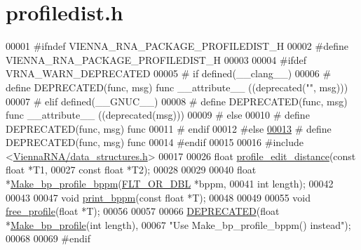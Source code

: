 \hypertarget{profiledist_8h_source}{}\section{profiledist.\+h}
\label{profiledist_8h_source}

\begin{DoxyCode}
00001 \textcolor{preprocessor}{#ifndef VIENNA\_RNA\_PACKAGE\_PROFILEDIST\_H}
00002 \textcolor{preprocessor}{#define VIENNA\_RNA\_PACKAGE\_PROFILEDIST\_H}
00003 
00004 \textcolor{preprocessor}{#ifdef VRNA\_WARN\_DEPRECATED}
00005 \textcolor{preprocessor}{# if defined(\_\_clang\_\_)}
00006 \textcolor{preprocessor}{#  define DEPRECATED(func, msg) func \_\_attribute\_\_ ((deprecated("", msg)))}
00007 \textcolor{preprocessor}{# elif defined(\_\_GNUC\_\_)}
00008 \textcolor{preprocessor}{#  define DEPRECATED(func, msg) func \_\_attribute\_\_ ((deprecated(msg)))}
00009 \textcolor{preprocessor}{# else}
00010 \textcolor{preprocessor}{#  define DEPRECATED(func, msg) func}
00011 \textcolor{preprocessor}{# endif}
00012 \textcolor{preprocessor}{#else}
\mbox{\hyperlink{profiledist_8h_aab347a3c03fbe8e7319551b9fa0cce4a}{00013}} \textcolor{preprocessor}{# define DEPRECATED(func, msg) func}
00014 \textcolor{preprocessor}{#endif}
00015 
00016 \textcolor{preprocessor}{#include <\mbox{\hyperlink{data__structures_8h}{ViennaRNA/data\_structures.h}}>}
00017 
00026 \textcolor{keywordtype}{float} \mbox{\hyperlink{profiledist_8h_abe75e90e00a1e5dd8862944ed53dad5d}{profile\_edit\_distance}}(\textcolor{keyword}{const} \textcolor{keywordtype}{float} *T1,
00027                             \textcolor{keyword}{const} \textcolor{keywordtype}{float} *T2);
00028 
00029 
00040 \textcolor{keywordtype}{float} *\mbox{\hyperlink{profiledist_8h_a3dff26e707a2a2e65a0f759caabde6e7}{Make\_bp\_profile\_bppm}}(\mbox{\hyperlink{group__data__structures_ga31125aeace516926bf7f251f759b6126}{FLT\_OR\_DBL}}  *bppm,
00041                             \textcolor{keywordtype}{int}         length);
00042 
00043 
00047 \textcolor{keywordtype}{void}  \mbox{\hyperlink{profiledist_8h_a8e0b4fe3698b3502945116ecc0ba6160}{print\_bppm}}(\textcolor{keyword}{const} \textcolor{keywordtype}{float} *T);
00048 
00049 
00055 \textcolor{keywordtype}{void}  \mbox{\hyperlink{profiledist_8h_a9b0b84a5a45761bf42d7c835dcdb3b85}{free\_profile}}(\textcolor{keywordtype}{float} *T);
00056 
00057 
00066 \mbox{\hyperlink{profiledist_8h_aab347a3c03fbe8e7319551b9fa0cce4a}{DEPRECATED}}(\textcolor{keywordtype}{float} *\mbox{\hyperlink{profiledist_8h_a904c7eaf4a2413567c00ac4891749d18}{Make\_bp\_profile}}(\textcolor{keywordtype}{int} length),
00067 \textcolor{stringliteral}{"Use Make\_bp\_profile\_bppm() instead"});
00068 
00069 \textcolor{preprocessor}{#endif}
\end{DoxyCode}
